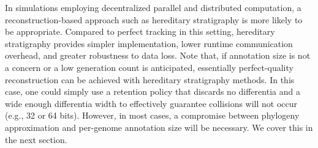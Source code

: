 In simulations employing decentralized parallel and distributed computation, a reconstruction-based approach such as hereditary stratigraphy is more likely to be appropriate.
Compared to perfect tracking in this setting, hereditary stratigraphy provides simpler implementation, lower runtime communication overhead, and greater robustness to data loss.
Note that, if annotation size is not a concern or a low generation count is anticipated, essentially perfect-quality reconstruction can be achieved with hereditary stratigraphy methods.
In this case, one could simply use a retention policy that discards no differentia and a wide enough differentia width to effectively guarantee collisions will not occur (e.g., 32 or 64 bits).
However, in most cases, a compromise between phylogeny approximation and per-genome annotation size will be necessary.
We cover this in the next section.

